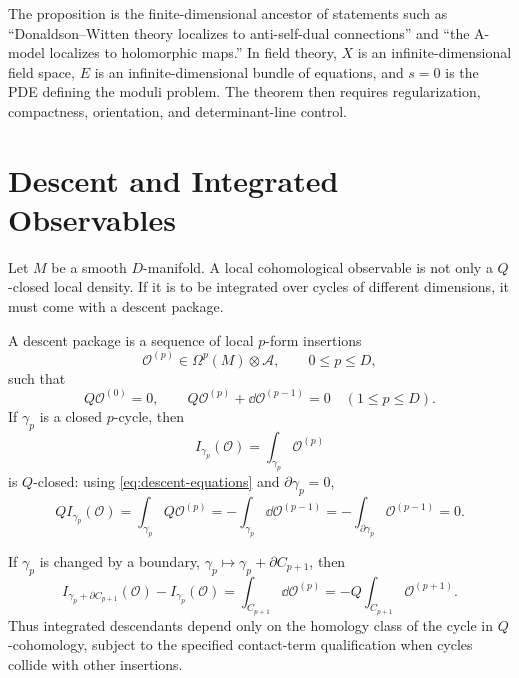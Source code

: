 The proposition is the finite-dimensional ancestor of statements such as
``Donaldson--Witten theory localizes to anti-self-dual connections'' and
``the A-model localizes to holomorphic maps.''  In field theory, \(X\) is an
infinite-dimensional field space, \(E\) is an infinite-dimensional bundle of
equations, and \(s=0\) is the PDE defining the moduli problem.  The theorem
then requires regularization, compactness, orientation, and determinant-line
control.

\section{Descent and Integrated Observables}

Let \(M\) be a smooth \(D\)-manifold.  A local cohomological observable is
not only a \(Q\)-closed local density.  If it is to be integrated over cycles
of different dimensions, it must come with a descent package.

\begin{definition}
\label{def:descent-package}
A descent package is a sequence of local \(p\)-form insertions
\[
  \mathcal O^{(p)}\in\Omega^p(M)\otimes\mathcal A,
  \qquad
  0\le p\le D,
\]
such that
\begin{equation}
  Q\mathcal O^{(0)}=0,
  \qquad
  Q\mathcal O^{(p)}+\dd\mathcal O^{(p-1)}=0
  \quad (1\le p\le D).
  \label{eq:descent-equations}
\end{equation}
If \(\gamma_p\) is a closed \(p\)-cycle, then
\begin{equation}
  I_{\gamma_p}(\mathcal O)=\int_{\gamma_p}\mathcal O^{(p)}
  \label{eq:descent-integrated-observable}
\end{equation}
is \(Q\)-closed: using \eqref{eq:descent-equations} and
\(\partial\gamma_p=0\),
\[
  Q I_{\gamma_p}(\mathcal O)
  =
  \int_{\gamma_p}Q\mathcal O^{(p)}
  =
  -\int_{\gamma_p}\dd\mathcal O^{(p-1)}
  =
  -\int_{\partial\gamma_p}\mathcal O^{(p-1)}
  =
  0 .
\]
\end{definition}

If \(\gamma_p\) is changed by a boundary,
\(\gamma_p\mapsto\gamma_p+\partial C_{p+1}\), then
\begin{equation}
  I_{\gamma_p+\partial C_{p+1}}(\mathcal O)-I_{\gamma_p}(\mathcal O)
  =
  \int_{C_{p+1}}\dd\mathcal O^{(p)}
  =
  -Q\int_{C_{p+1}}\mathcal O^{(p+1)} .
  \label{eq:descent-homology-q-exact-shift}
\end{equation}
Thus integrated descendants depend only on the homology class of the cycle in
\(Q\)-cohomology, subject to the specified contact-term qualification when
cycles collide with other insertions.

